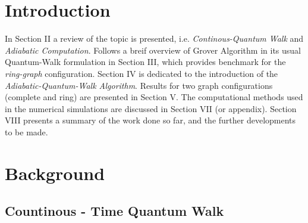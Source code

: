 \documentclass[aps,pra,reprint, onecolumn]{revtex4-2}
\begin{document}

\maketitle


\section{Introduction}

In Section II a review of the topic is presented, i.e. \textit{Continous-Quantum Walk} and \textit{Adiabatic Computation}. Follows a breif overview of Grover Algorithm in its usual Quantum-Walk formulation in Section III, which provides benchmark for the \textit{ring-graph} configuration. Section IV is dedicated to the introduction of the \textit{Adiabatic-Quantum-Walk Algorithm}. Results for two graph configurations (complete and ring) are presented in Section V. The computational methods used in the numerical simulations are discussed in Section VII (or appendix). Section VIII presents a summary of the work done so far, and the further developments to be made.


\section{Background}
\subsection{Countinous - Time Quantum Walk}
\end{document}
